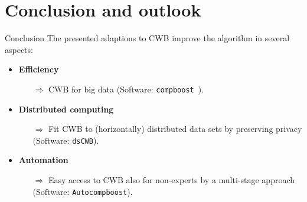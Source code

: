 \documentclass[t,10pt]{beamer}
\begin{document}

\section{Conclusion and outlook}

\begin{frame}{Conclusion}
      The presented adaptions to CWB improve the algorithm in several aspects:
      \begin{itemize}
        \item
          \textbf{Efficiency}~\citep{schalk2022accelerated}
        \begin{itemize}
          \item[$\Rightarrow$]
            CWB for big data (Software: \texttt{compboost}~\citep{schalk2018compboost}).
        \end{itemize}
        \item
          \textbf{Distributed computing}~\citep{schalk2022distcwb}
            \begin{itemize}
              \item[$\Rightarrow$]
                Fit CWB to (horizontally) distributed data sets by preserving privacy (Software: \texttt{dsCWB}).
            \end{itemize}
        \item \textbf{Automation}~\citep{coors2021autocompboost}
          \begin{itemize}\item[$\Rightarrow$]
            Easy access to CWB also for non-experts by a multi-stage approach (Software: \texttt{Autocompboost}).
          \end{itemize}
      \end{itemize}
\end{frame}
\end{document}
